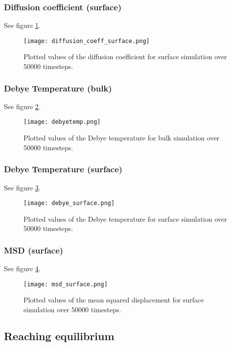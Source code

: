 \subsubsection{Diffusion coefficient (surface)}
See figure \ref{diffsf}.
\begin{figure}[H]
	\centering
	\texttt{[image: diffusion\_coeff\_surface.png]}
	\caption{Plotted values of the diffusion coefficient for surface simulation over 50000 timesteps.}
	\label{diffsf}
\end{figure}


\subsubsection{Debye Temperature (bulk)}
See figure \ref{debye}.
\begin{figure}[H]
	\centering
	\texttt{[image: debyetemp.png]}
	\caption{Plotted values of the Debye temperature for bulk simulation over 50000 timesteps.}
	\label{debye}
\end{figure}

\subsubsection{Debye Temperature (surface)}
See figure \ref{debyesf}.
\begin{figure}[H]
	\centering
	\texttt{[image: debye\_surface.png]}
	\caption{Plotted values of the Debye temperature for surface simulation over 50000 timesteps.}
	\label{debyesf}
\end{figure}

\subsubsection{MSD (surface)}
See figure \ref{msdsf}.
\begin{figure}[H]
	\centering
	\texttt{[image: msd\_surface.png]}
	\caption{Plotted values of the mean squared displacement for surface simulation over 50000 timesteps.}
	\label{msdsf}
\end{figure}


\subsection{Reaching equilibrium}
